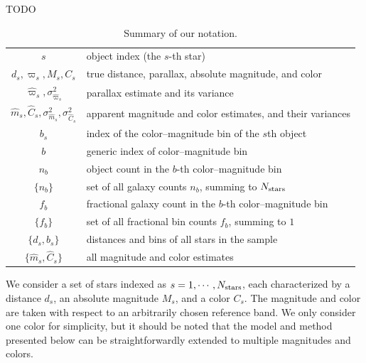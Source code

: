 \documentclass[manuscript, letterpaper]{aastex6}
\makeatletter
\let\origsection\section
\renewcommand\section{\@ifstar{\starsection}{\nostarsection}}
\newcommand\nostarsection[1]{\sectionprelude\origsection{#1}}
\newcommand\starsection[1]{\sectionprelude\origsection*{#1}}
\newcommand\sectionprelude{\vspace{1em}}
\newcommand{\nobj}{{N_{\rm stars}}}
\makeatother
\begin{document}
\section{Introduction}

TODO

\section{Model}


\begin{table} %
\centering
\begin{tabular}{cl}
\hline
$s$	&	object index (the $s$-th star)\\
$d_s, \varpi_s, M_s, C_s$	&	true distance, parallax, absolute magnitude, and color	\\
$\hat{\varpi}_s, \sigma_{\hat{\varpi}_s}^2$ 	&	parallax estimate and its variance\\
$\hat{m}_s, \hat{C}_s, \sigma^2_{\hat{m}_s}, \sigma^2_{\hat{C}_s}$ 	&	apparent magnitude and color estimates, and their variances\\
$b_s$	&	index of the color--magnitude bin of the $s$th object\\
\hline
$b$	&	generic index of color--magnitude bin\\
$n_b$	& 	object count in the $b$-th color--magnitude bin  \\
$\{n_b\}$	&	set of all galaxy counts $n_b$, summing to $\nobj$\\
$f_b$	&	fractional galaxy count in the $b$-th color--magnitude bin  \\
$\{f_b\}$	&	set of all fractional bin counts $f_b$, summing to $1$\\
$\{ d_s, b_s\}$	&	distances and bins of all stars in the sample	\\
$\{ \hat{m}_s, \hat{C}_s \}$ &	all magnitude and color estimates\\
\hline
\end{tabular}
\caption{Summary of our notation. }
\label{tab:notation}
\end{table} 

We consider a set of stars indexed as $s=1, \cdots, \nobj$, each characterized by a distance $d_s$, an absolute magnitude $M_s$, and a color $C_s$. 
The magnitude and color are taken with respect to an arbitrarily chosen reference band.
We only consider one color for simplicity, but it should be noted that the model and method presented below can be straightforwardly extended to multiple magnitudes and colors.
\end{document}
